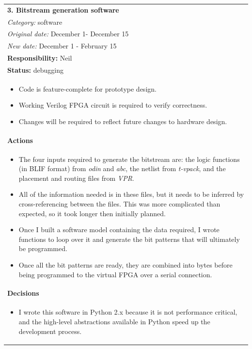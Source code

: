 \documentclass[12pt,letterpaper]{article}
\begin{document}
\begin{tabular}{|p{6.4in}|}
\hline
\textbf{3. Bitstream generation software} \\
\emph{Category:} software \\
\emph{Original date:} December 1- December 15 \\
\emph{New date:} December 1 - February 15 \\
\hline
\textbf{Responsibility:} Neil \\
\hline
\textbf{Status:} debugging \\
\vspace{-1em}
\begin{itemize}
\item Code is feature-complete for prototype design.
\item Working Verilog FPGA circuit is required to verify correctness.
\item Changes will be required to reflect future changes to hardware design.
\end{itemize} 
\vspace{-1em} \\
\hline
\textbf{Actions} \\
\vspace{-1em}
\begin{itemize}
\item The four inputs required to generate the bitstream are: the logic functions (in BLIF format) from \emph{odin} and \emph{abc}, the netlist from \emph{t-vpack}, and the placement and routing files from \emph{VPR}.
\item All of the information needed is in these files, but it needs to be inferred by cross-referencing between the files. This was more complicated than expected, so it took longer then initially planned.
\item Once I built a software model containing the data required, I wrote functions to loop over it and generate the bit patterns that will ultimately be programmed.
\item Once all the bit patterns are ready, they are combined into bytes before being programmed to the virtual FPGA over a serial connection.
\end{itemize} 
\vspace{-1em} \\
\hline
\textbf{Decisions} \\
\vspace{-1em}
\begin{itemize}
\item I wrote this software in Python 2.x because it is not performance critical, and the high-level abstractions available in Python speed up the development process.

\end{itemize}
\end{tabular}
\end{document}
